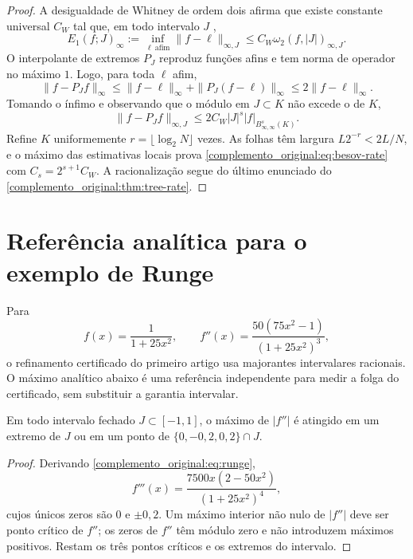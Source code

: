 \begin{proof}
A desigualdade de Whitney de ordem dois afirma que existe constante universal $C_W$ tal que, em todo intervalo $J$ \citep{artigo_2-whitney1957,artigo_1-devore1998},
\[
 E_1(f;J)_\infty:=\inf_{\ell\ \mathrm{afim}}\|f-\ell\|_{\infty,J}
 \le C_W\omega_2(f,|J|)_{\infty,J}.
\]
O interpolante de extremos $P_J$ reproduz funções afins e tem norma de operador no máximo $1$. Logo, para toda $\ell$ afim,
\[
 \|f-P_Jf\|_\infty
 \le\|f-\ell\|_\infty+\|P_J(f-\ell)\|_\infty
 \le2\|f-\ell\|_\infty.
\]
Tomando o ínfimo e observando que o módulo em $J\subset K$ não excede o de $K$,
\[
 \|f-P_Jf\|_{\infty,J}
 \le2C_W|J|^s|f|_{B^s_{\infty,\infty}(K)}.
\]
Refine $K$ uniformemente $r=\lfloor\log_2N\rfloor$ vezes. As folhas têm largura $L2^{-r}<2L/N$, e o máximo das estimativas locais prova \eqref{complemento_original:eq:besov-rate} com $C_s=2^{s+1}C_W$. A racionalização segue do último enunciado do \cref{complemento_original:thm:tree-rate}.
\end{proof}

\setcounter{section}{20}
\section{Referência analítica para o exemplo de Runge}
Para
\begin{equation}
 f(x)=\frac{1}{1+25x^2},\qquad
 f''(x)=\frac{50(75x^2-1)}{(1+25x^2)^3},
 \label{complemento_original:eq:runge}
\end{equation}
o refinamento certificado do primeiro artigo usa majorantes intervalares racionais. O máximo analítico abaixo é uma referência independente para medir a folga do certificado, sem substituir a garantia intervalar.

\begin{lemma}\label{map:complemento_original:21.1}\label{complemento_original:lem:runge-majorant}
Em todo intervalo fechado $J\subset[-1,1]$, o máximo de $|f''|$ é atingido em um extremo de $J$ ou em um ponto de $\{0,-0{,}2,0{,}2\}\cap J$.
\end{lemma}

\begin{proof}
Derivando \eqref{complemento_original:eq:runge},
\[
 f'''(x)=\frac{7500x(2-50x^2)}{(1+25x^2)^4},
\]
cujos únicos zeros são $0$ e $\pm0{,}2$. Um máximo interior não nulo de $|f''|$ deve ser ponto crítico de $f''$; os zeros de $f''$ têm módulo zero e não introduzem máximos positivos. Restam os três pontos críticos e os extremos do intervalo.
\end{proof}

